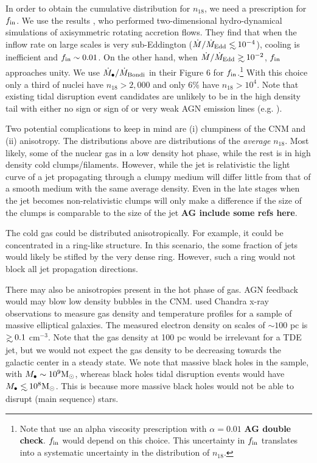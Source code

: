 \documentclass[usenatbib,fleqn]{mnras}
\newcommand\lsim{\mathrel{\rlap{\lower4pt\hbox{\hskip1pt$\sim$}}
    \raise1pt\hbox{$<$}}}
\newcommand\gsim{\mathrel{\rlap{\lower4pt\hbox{\hskip1pt$\sim$}}
    \raise1pt\hbox{$>$}}}
\newcommand{\Mbh}[1][]{M_{\bullet#1}}
\newcommand{\Msun}{{\rm M_\odot}}
\begin{document}
In order to obtain the cumulative distribution for $n_{18}$, we need a
prescription for $f_{\rm in}$. We use the results \citet{Li+2013}, who
performed two-dimensional hydro-dynamical simulations of axisymmetric
rotating accretion flows. They find that when the inflow rate on large
scales is very sub-Eddington ($\dot{M}/\dot{M}_{\rm Edd} \lsim
10^{-4}$), cooling is inefficient and $f_{\rm in}\sim 0.01$. On the
other hand, when $\dot{M}/\dot{M}_{\rm Edd}\gsim 10^{-2}$, $f_{\rm
  in}$ approaches unity.  We use $\dot{M}_{\bullet}/\dot{M}_{\rm
  Bondi}$ in their Figure 6 for $f_{\rm in}$.\footnote{Note that
  \citet{Li+2013} use an alpha viscosity prescription with
  $\alpha=0.01$ {\bf AG double check}.  $f_{\rm in}$ would depend on
  this choice. This uncertainty in $f_{\rm in}$ translates into a
  systematic uncertainty in the distribution of $n_{18}$.}  With this
choice only a third of nuclei have $n_{18}>2,000$ and only 6\% have
$n_{18}>10^{4}$. Note that existing tidal disruption event candidates
are unlikely to be in the high density tail with either no sign or
sign of or very weak AGN emission lines
(e.g. \citealt{van-Velzen+2011, Arcavi+2014}).

Two potential complications to keep in mind are (i) clumpiness of the
CNM and (ii) anisotropy. The distributions above are distributions of
the {\it average} $n_{18}$.  Most likely, some of the nuclear gas in a
low density hot phase, while the rest is in high density cold
clumps/filaments.  However, while the jet is relativistic the
light curve of a jet propagating through a clumpy medium will differ
little from that of a smooth medium with the same average
density. Even in the late stages when the jet becomes non-relativistic
clumps will only make a difference if the size of the clumps is
comparable to the size of the jet {\bf AG include some refs here}.

The cold gas could be distributed anisotropically. For example, it
could be concentrated in a ring-like structure. In this scenario, the
some fraction of jets would likely be stifled by the very dense
ring. However, such a ring would not block all jet propagation
directions.

There may also be anisotropies present in the hot phase of gas. AGN
feedback would may blow low density bubbles in the
CNM. \citet{Russell+2013} used Chandra x-ray observations to measure
gas density and temperature profiles for a sample of massive
elliptical galaxies. The measured electron density on scales of $\sim
100$ pc is $\gsim 0.1$ cm$^{-3}$. Note that the gas density at 100 pc
would be irrelevant for a TDE jet, but we would not expect the gas
density to be decreasing towards the galactic center in a steady
state.  We note that massive black holes in the \citet{Russell+2013}
sample, with $\Mbh\sim 10^{9} \Msun$, whereas black holes tidal
disruption events would have $\Mbh\lsim 10^8 \Msun$. This is because
more massive black holes would not be able to disrupt (main sequence)
stars.
\end{document}
